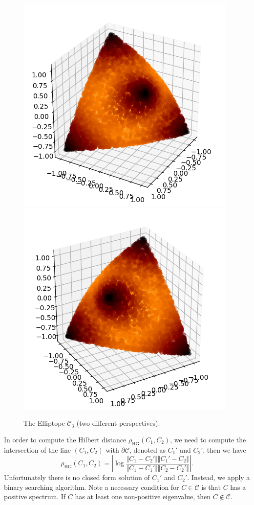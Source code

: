 \documentclass[graybox]{svmult}
\begin{document}
\begin{figure}[t]
\centering
\includegraphics[width=.4\textwidth]{elliptope30}
\includegraphics[width=.4\textwidth]{elliptope60}
\caption{The Elliptope $\mathcal{C}_3$ (two different perspectives).}\label{fig:elliptope}
\end{figure}

In order to compute the Hilbert distance $\rho_{\mathrm{HG}}(C_1,C_2)$, we
need to compute the intersection of the line $(C_1,C_2)$ with 
$\partial\mathcal{C}$, denoted as $C_1'$ and $C_2$', then we have
$$
\rho_{\mathrm{HG}}(C_1,C_2)=
\left\vert
\log\frac{\Vert{}C_1-C_2'\Vert \Vert{}C_1'-C_2\Vert}{\Vert{}C_1-C_1'\Vert \Vert{}C_2-C_2'\Vert}
\right\vert.
$$
Unfortunately there is no closed form solution of $C_1'$ and $C_2'$.
Instead, we apply a binary searching algorithm.
Note a necessary condition for $C\in\mathcal{C}$ is that $C$ has a positive spectrum.
If $C$ has at least one non-positive eigenvalue, then $C\notin\mathcal{C}$.
\end{document}
